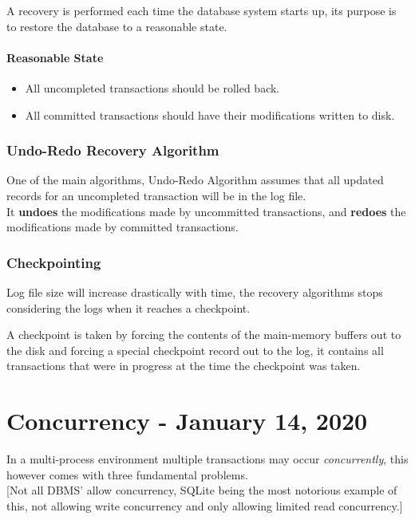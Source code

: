 \documentclass[11pt,a4paper,twocolumn]{book}
\begin{document}
A recovery is performed each time the database system starts up, its purpose is to restore the database to a reasonable state.

\subsubsection{Reasonable State}

\begin{itemize}
\item All uncompleted transactions should be rolled back.
\item All committed transactions should have their modifications written to disk.
\end{itemize}


\subsection{Undo-Redo Recovery Algorithm}

One of the main algorithms, Undo-Redo Algorithm assumes that all updated records for an uncompleted transaction will be in the log file.\\

It \textbf{undoes} the modifications made by uncommitted transactions, and \textbf{redoes} the modifications made by committed transactions.

\subsection{Checkpointing}

Log file size will increase drastically with time, the recovery algorithms stops considering the logs when it reaches a checkpoint.

A checkpoint is taken by forcing the contents of the main-memory buffers out to the disk and forcing a special checkpoint record out to the log, it contains all transactions that were in progress at the time the checkpoint was taken.

\chapter{Concurrency - January 14, 2020}

In a multi-process environment multiple transactions may occur \textit{concurrently}, this however comes with three fundamental problems.\\

[Not all DBMS' allow concurrency, SQLite being the most notorious example of this, not allowing write concurrency and only allowing limited read concurrency.]
\end{document}
